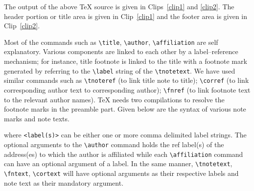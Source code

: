 \documentclass[a4paper,12pt]{article}
\begin{document}
\begin{vquote}

\end{vquote}

The output of the above \TeX{} source is given in Clips~\ref{clip1} and
\ref{clip2}. The header portion or title area is given in
Clip~\ref{clip1} and the footer area is given in Clip~\ref{clip2}.

\def\rulecolor{blue!70}
\def\rulecolor{orange}

\def\rulecolor{blue!70}
\def\rulecolor{orange}

Most of the commands such as \verb+\title+, \verb+\author+,
\verb+\affiliation+ are self explanatory.  Various components are
linked to each other by a label--reference mechanism; for
instance, title footnote is linked to the title with a footnote
mark generated by referring to the \verb+\label+ string of
the \verb=\tnotetext=.  We have used similar commands
such as \verb=\tnoteref= (to link title note to title);
\verb=\corref= (to link corresponding author text to
corresponding author); \verb=\fnref= (to link footnote text to
the relevant author names).  \TeX{} needs two compilations to
resolve the footnote marks in the preamble part.  
Given below are the syntax of various note marks and note texts.


\begin{vquote}
\end{vquote}

\noindent where \verb=<label(s)>= can be either one or more comma
delimited label strings. The optional arguments to the
\verb=\author= command holds the ref label(s) of the address(es)
to which the author is affiliated while each \verb=\affiliation=
command can have an optional argument of a label. In the same
manner, \verb=\tnotetext=, \verb=\fntext=, \verb=\cortext= will
have optional arguments as their respective labels and note text
as their mandatory argument.
\end{document}
